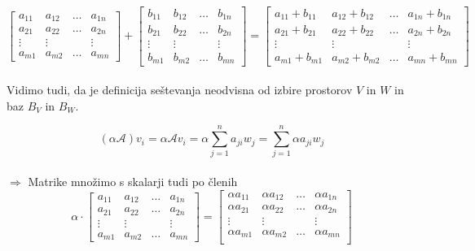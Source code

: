 \documentclass[a4paper,12pt]{article}
\begin{document}
$$
\begin{bmatrix}
	a_{11}&a_{12}&\ldots&a_{1n} \\
	a_{21}&a_{22}&\ldots&a_{2n} \\
	\vdots&\vdots&~&\vdots \\
	a_{m1}&a_{m2}&\ldots&a_{mn}
\end{bmatrix}
+
\begin{bmatrix}
	b_{11}&b_{12}&\ldots&b_{1n} \\
	b_{21}&b_{22}&\ldots&b_{2n} \\
	\vdots&\vdots&~&\vdots \\
	b_{m1}&b_{m2}&\ldots&b_{mn}
\end{bmatrix}
=
\begin{bmatrix}
	a_{11}+b_{11}&a_{12}+b_{12}&\ldots&a_{1n}+b_{1n} \\
	a_{21}+b_{21}&a_{22}+b_{22}&\ldots&a_{2n}+b_{2n} \\
	\vdots&\vdots&~&\vdots \\
	a_{m1}+b_{m1}&a_{m2}+b_{m2}&\ldots&a_{mn}+b_{mn}
\end{bmatrix}
$$ \\

Vidimo tudi, da je definicija seštevanja neodvisna od izbire prostorov $V$ in $W$ in baz $B_V$ in $B_W$.

$$ (\alpha \mathcal{A})v_i=\alpha \mathcal{A}v_i=\alpha \sum_{j=1}^n a_{ji} w_j=\sum_{j=1}^n \alpha a_{ji} w_j $$ \\

$\Rightarrow$ Matrike množimo s skalarji tudi po členih \\

$$ \alpha \cdot 
\begin{bmatrix}
	a_{11}&a_{12}&\ldots&a_{1n} \\
	a_{21}&a_{22}&\ldots&a_{2n} \\
	\vdots&\vdots&~&\vdots \\
	a_{m1}&a_{m2}&\ldots&a_{mn}
\end{bmatrix} =
\begin{bmatrix}
	\alpha a_{11}&\alpha a_{12}&\ldots&\alpha a_{1n} \\
	\alpha a_{21}&\alpha a_{22}&\ldots&\alpha a_{2n} \\
	\vdots&\vdots&~&\vdots \\
	\alpha a_{m1}&\alpha a_{m2}&\ldots&\alpha a_{mn} \\
\end{bmatrix} $$ \\
\end{document}
